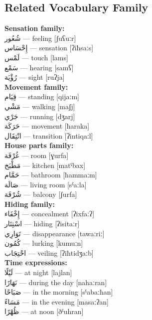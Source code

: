 \documentclass[letter,12pt]{article}
\begin{document}
\subsection{Related Vocabulary Family}
\begin{multicols}{2}

\textbf{Sensation family:}\\
\textarabic{شُعُور} — feeling [ʃuʕuːr]\\
\textarabic{إِحْسَاس} — sensation [ʔiħsaːs]\\
\textarabic{لَمْس} — touch [lams]\\
\textarabic{سَمْع} — hearing [samʕ]\\
\textarabic{رُؤْيَة} — sight [ruʔja]\\

\textbf{Movement family:}\\
\textarabic{قِيَام} — standing [qijaːm]\\
\textarabic{مَشْي} — walking [maʃj]\\
\textarabic{جَرْي} — running [dʒarj]\\
\textarabic{حَرَكَة} — movement [ħaraka]\\
\textarabic{انْتِقَال} — transition [ʔintiqaːl]\\

\textbf{House parts family:}\\
\textarabic{غُرْفَة} — room [ɣurfa]\\
\textarabic{مَطْبَخ} — kitchen [matˤbax]\\
\textarabic{حَمَّام} — bathroom [ħammaːm]\\
\textarabic{صَالَة} — living room [sˤaːla]\\
\textarabic{شُرْفَة} — balcony [ʃurfa]\\

\textbf{Hiding family:}\\
\textarabic{إِخْفَاء} — concealment [ʔixfaːʔ]\\
\textarabic{اسْتِتَار} — hiding [ʔisitaːr]\\
\textarabic{تَوَارِي} — disappearance [tawaːriː]\\
\textarabic{كُمُون} — lurking [kumuːn]\\
\textarabic{احْتِجَاب} — veiling [ʔiħtidʒaːb]\\

\textbf{Time expressions:}\\
\textarabic{لَيْلًا} — at night [lajlan]\\
\textarabic{نَهَارًا} — during the day [nahaːran]\\
\textarabic{صَبَاحًا} — in the morning [sˤabaːħan]\\
\textarabic{مَسَاءً} — in the evening [masaːʔan]\\
\textarabic{ظُهْرًا} — at noon [ðˤuhran]\\


\end{multicols}
\end{document}
